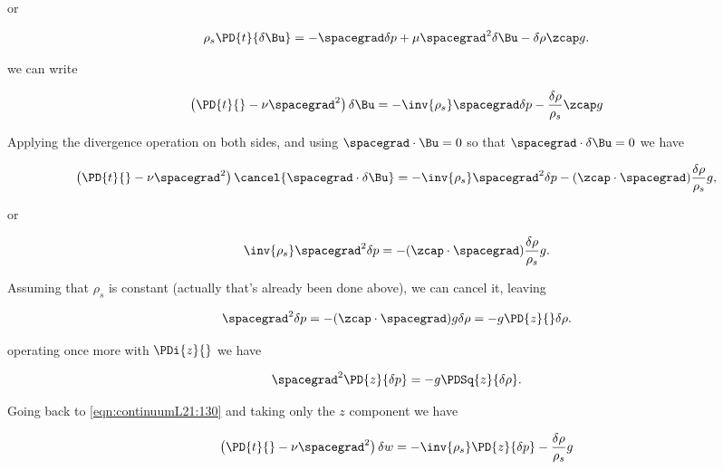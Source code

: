 or

\begin{equation}\label{eqn:continuumL21:110c}
\rho_s \PD{t}{\delta \Bu} = - \spacegrad \delta p + \mu \spacegrad^2 \delta \Bu - \delta \rho \zcap g.
\end{equation}

we can write

\begin{equation}\label{eqn:continuumL21:130}
\left( \PD{t}{} - \nu \spacegrad^2 \right) \delta \Bu = -\inv{\rho_s} \spacegrad \delta p - \frac{\delta \rho}{\rho_s} \zcap g
\end{equation}

Applying the divergence operation on both sides, and using $\spacegrad \cdot \Bu = 0$ so that $\spacegrad \cdot \delta \Bu = 0$ we have

\begin{equation}\label{eqn:continuumL21:150}
\left( \PD{t}{} - \nu \spacegrad^2 \right) \cancel{\spacegrad \cdot \delta \Bu} = -\inv{\rho_s} \spacegrad^2 \delta p - (\zcap \cdot \spacegrad ) \frac{\delta \rho}{\rho_s} g,
\end{equation}

or

\begin{equation}\label{eqn:continuumL21:170}
\inv{\rho_s} \spacegrad^2 \delta p = - (\zcap \cdot \spacegrad ) \frac{\delta \rho}{\rho_s} g.
\end{equation}

Assuming that $\rho_s$ is constant (actually that's already been done above), we can cancel it, leaving

\begin{equation}\label{eqn:continuumL21:190}
\spacegrad^2 \delta p = - (\zcap \cdot \spacegrad ) g \delta \rho = -g \PD{z}{} \delta \rho.
\end{equation}

operating once more with $\PDi{z}{}$ we have

\begin{equation}\label{eqn:continuumL21:210}
\spacegrad^2 \PD{z}{\delta p} = -g \PDSq{z}{\delta \rho}.
\end{equation}

Going back to \ref{eqn:continuumL21:130} and taking only the $z$ component we have

\begin{equation}\label{eqn:continuumL21:230}
\left( \PD{t}{} - \nu \spacegrad^2 \right) \delta w = -\inv{\rho_s} \PD{z}{\delta p} - \frac{\delta \rho}{\rho_s} g
\end{equation}

